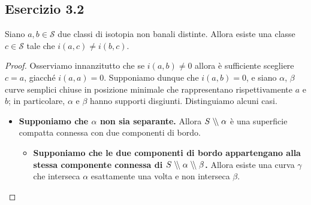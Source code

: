 \subsection*{Esercizio 3.2}
\begin{lemma}
Siano $a,b\in\mathcal{S}$ due classi di isotopia non banali distinte. Allora esiste una classe $c\in\mathcal{S}$ tale che $i(a,c)\neq i(b,c)$.
\end{lemma}
\begin{proof}
Osserviamo innanzitutto che se $i(a,b)\neq 0$ allora è sufficiente scegliere $c=a$, giacché $i(a,a)=0$. Supponiamo dunque che $i(a,b)=0$, e siano $\alpha$, $\beta$ curve semplici chiuse in posizione minimale che rappresentano rispettivamente $a$ e $b$; in particolare, $\alpha$ e $\beta$ hanno supporti disgiunti. Distinguiamo alcuni casi.
\begin{itemize}
\item \textbf{Supponiamo che $\alpha$ non sia separante.} Allora $S\mathrel{\setminus\mkern-4mu\setminus} \alpha$ è una superficie compatta connessa con due componenti di bordo.

\begin{center}
\end{center}

\begin{itemize}
\item \textbf{Supponiamo che le due componenti di bordo appartengano alla stessa componente connessa di $S\mathrel{\setminus\mkern-4mu\setminus}\alpha\mathrel{\setminus\mkern-4mu\setminus}\beta$.} Allora esiste una curva $\gamma$ che interseca $\alpha$ esattamente una volta e non interseca $\beta$.


\end{itemize}
\end{itemize}
\end{proof}
